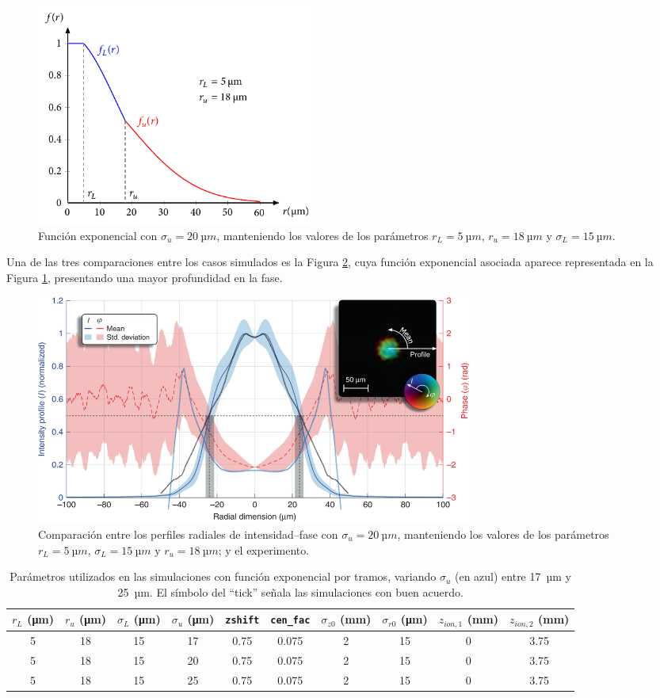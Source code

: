 \begin{figure}[htbp]
  \centering
  \includegraphics[width=0.45\textwidth]{Figuras/ch4_fexp2.pdf}
  \caption{Función exponencial con $\sigma_{u}=\qty{20}{µm}$, manteniendo los valores de los parámetros $r_{L}=\qty{5}{µm}$, $r_{u}=\qty{18}{µm}$ y $\sigma_{L}=\qty{15}{µm}$.}
  \label{fig:4.32}
\end{figure}

Una de las tres comparaciones entre los casos simulados es la Figura \ref{fig:4.33}, cuya función exponencial asociada aparece representada en la Figura \ref{fig:4.32}, presentando una mayor profundidad en la fase.

\begin{figure}[htbp]
  \centering
  \includegraphics[width=0.7\textwidth]{Figuras/ch4_cmp81.png}
  \caption{Comparación entre los perfiles radiales de intensidad--fase con $\sigma_{u}=\qty{20}{µm}$, manteniendo los valores de los parámetros $r_{L}=\qty{5}{µm}$, $\sigma_{L}=\qty{15}{µm}$ y $r_{u}=\qty{18}{µm}$; y el experimento.}
  \label{fig:4.33}
\end{figure}

\begin{table}[htpb]
  \centering
  \scriptsize
  \caption{Parámetros utilizados en las simulaciones con función exponencial por tramos, variando $\sigma_{u}$ (en azul) entre \qty{17}{µm} y \qty{25}{µm}. El símbolo del \enquote{tick} señala las simulaciones con buen acuerdo.}
  \label{tab:4.10}
  \begin{tabular}{SSS>{\color{miazul}}SSSSSSS}
  \toprule
  {$r_{L}$ (\unit{\um})} & {$r_{u}$ (\unit{\um})} & {$\sigma_{L}$ (\unit{\um})} & {$\sigma_{u}$ (\unit{\um})} & {\texttt{zshift}} & {\texttt{cen\_fac}} & {$\sigma_{z0}$ (\unit{mm})} & {$\sigma_{r0}$ (\unit{\um})} & {$z_{ion,1}$ (\unit{mm})} & {$z_{ion,2}$ (\unit{mm})} \\ 
    & 18  & 15 & 17  & 0.75  & 0.075  & 2  & 15  & 0  & 3.75  \\
  5  & 18  & 15 & 20  & 0.75  & 0.075  & 2  & 15  & 0  & 3.75  \\
  5  & 18  & 15 & 25  & 0.75  & 0.075  & 2  & 15  & 0  & 3.75  \\
  \bottomrule
  \end{tabular}
\end{table}


